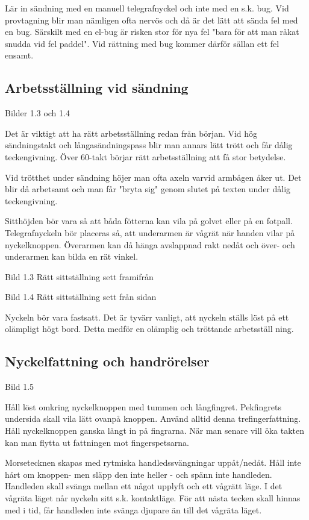 Lär in sändning med en manuell telegrafnyckel och inte med en s.k. bug. Vid provtagning blir man nämligen ofta nervös och då är det lätt att sända fel med en bug. Särskilt
med en el-bug är risken stor för nya fel "bara för att man råkat snudda vid fel paddel".
Vid rättning med bug kommer därför sällan ett fel ensamt.

\subsection{Arbetsställning vid sändning}

Bilder 1.3 och 1.4

Det är viktigt att ha rätt arbetsställning redan från början. Vid hög sändningstakt och
långasändningspass blir man annars lätt trött och får dålig teckengivning.
Över 60-takt börjar rätt arbetsställning att få stor betydelse.

Vid trötthet under sändning höjer man ofta axeln varvid armbågen åker ut. Det blir
då arbetsamt och man får "bryta sig" genom slutet på texten under dålig teckengivning.

Sitthöjden bör vara så att båda fötterna kan vila på golvet eller på en fotpall.
Telegrafnyckeln bör placeras så, att underarmen är vågrät när handen vilar på
nyckelknoppen. Överarmen kan då hänga avslappnad rakt nedåt och över- och underarmen kan
bilda en rät vinkel.

Bild 1.3 Rätt sittställning sett framifrån


Bild 1.4 Rätt sittställning sett från sidan

Nyckeln bör vara fastsatt. Det är tyvärr vanligt, att nyckeln ställs löst på ett olämpligt
högt bord. Detta medför en olämplig och tröttande arbetsställ ning.

\subsection{Nyckelfattning och handrörelser}

Bild 1.5

Håll löst omkring nyckelknoppen med tummen och långfingret. Pekfingrets undersida
skall vila lätt ovanpå knoppen. Använd alltid denna trefingerfattning. Håll nyckelknoppen
ganska långt in på fingrarna. När man senare vill öka takten kan man flytta ut fattningen mot fingerspetsarna.

Morsetecknen skapas med rytmiska handledssvängningar uppåt/nedåt. Håll inte
hårt om knoppen- men släpp den inte heller - och spänn inte handleden. Handleden
skall svänga mellan ett något upplyft och ett vågrätt läge. I det vågräta läget når
nyckeln sitt s.k. kontaktläge. För att nästa tecken skall hinnas med i tid, får handleden
inte svänga djupare än till det vågräta läget.

